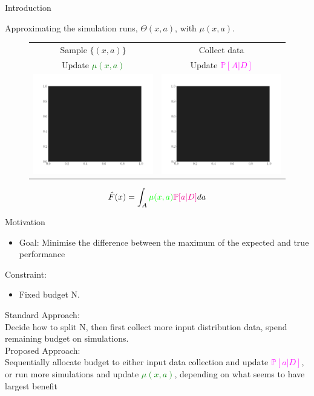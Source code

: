 \documentclass{beamer}
\begin{document}
\begin{frame}{Introduction}

Approximating the simulation runs, $\Theta (x,a)$, with $\mu (x,a)$.

\begin{figure}
	\centering
	\begin{tabular}{cc}
		Sample $\{(x,a)\}$ & Collect data\\
		Update \textcolor{green}{$\mu (x,a)$}& Update \textcolor{magenta}{$\mathbb{P}[A|D]$}\\
		\includegraphics[width=5.5cm]{FILLING.png}&
		\includegraphics[width=5.5cm]{FILLING.png}\\
	\end{tabular}

$$ \hat{F}(x) = \int_{A} \textcolor{green}{\mu (x,a)} \textcolor{magenta}{\mathbb{P}[a|D]}da$$
\end{figure}
\end{frame}

\begin{frame}{Motivation}
\begin{itemize}
\item Goal: Minimise the difference between the maximum of the expected and true performance\\
\end{itemize}

	Constraint:
\begin{itemize}
	\item Fixed budget N.
\end{itemize}
\vspace{5mm}
Standard Approach:\\
Decide how to split N, then first collect more input distribution data, spend remaining budget on simulations.\\
\vspace{5mm}
Proposed Approach:\\
Sequentially allocate budget to either input data collection and update \textcolor{magenta}{$\mathbb{P}[a|D]$}, or run more simulations and update \textcolor{green}{$\mu(x,a)$}, depending on what seems to have largest benefit


\end{frame}
\end{document}
